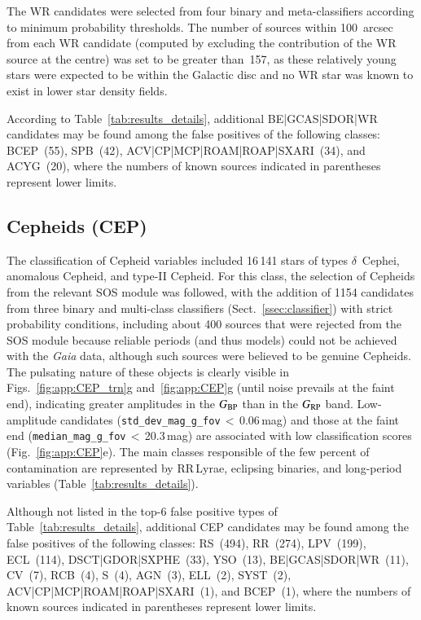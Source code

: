 \documentclass[longauth]{aa}
\def\gaia{\textit{Gaia}\xspace}
\def\bp{$G_{\rm BP}$\xspace}
\def\rp{$G_{\rm RP}$\xspace}
\begin{document}
The WR candidates were selected from four binary and meta-classifiers according to minimum probability thresholds.
The number of sources within 100~arcsec from each WR candidate (computed by excluding the contribution of the WR source at the centre) was set to be greater than~157, as these relatively young stars were expected to be within the Galactic disc and no WR star was known to exist in lower star density fields.

According to Table~\ref{tab:results_details}, additional BE|GCAS|SDOR|WR candidates may be found among the false positives of the following classes: BCEP~(55), SPB~(42), ACV|CP|MCP|ROAM|ROAP|SXARI~(34), and ACYG~(20), where the numbers of known sources indicated in parentheses represent lower limits.



\subsection{Cepheids (CEP)\label{ssec:cep}}

The classification of Cepheid variables included 16\,141 stars of types $\delta$~Cephei, anomalous Cepheid, and type-II Cepheid. 
For this class, the selection of Cepheids from the relevant SOS module \citep{DR3-DPACP-169} was followed, with the addition of 1154 candidates from three binary and multi-class classifiers (Sect.~\ref{ssec:classifier}) with strict probability conditions, including about 400 sources that were rejected from the SOS module because reliable periods (and thus models) could not be achieved with the \gaia data, although such sources were believed to be genuine Cepheids. 
The pulsating nature of these objects is clearly visible in Figs.~\ref{fig:app:CEP_trn}g and~\ref{fig:app:CEP}g (until noise prevails at the faint end), indicating greater amplitudes in the \bp than in the \rp band. 
Low-amplitude candidates (\texttt{std\_dev\_mag\_g\_fov}\,$<$\,0.06\,mag) and those at the faint end (\texttt{median\_mag\_g\_fov}\,$<$\,20.3\,mag) are associated with low classification scores (Fig.~\ref{fig:app:CEP}e). 
The main classes responsible of the few percent of contamination are represented by RR\,Lyrae, eclipsing binaries, and long-period variables (Table~\ref{tab:results_details}). 

Although not listed in the top-6 false positive types of Table~\ref{tab:results_details}, additional CEP candidates may be found among the false positives of the following classes: RS~(494), RR~(274), LPV~(199), ECL~(114), DSCT|GDOR|SXPHE~(33), YSO~(13), BE|GCAS|SDOR|WR~(11), CV~(7), RCB~(4), S~(4), AGN~(3), ELL~(2), SYST~(2), ACV|CP|MCP|ROAM|ROAP|SXARI~(1), and BCEP~(1), where the numbers of known sources indicated in parentheses represent lower limits.
\end{document}

